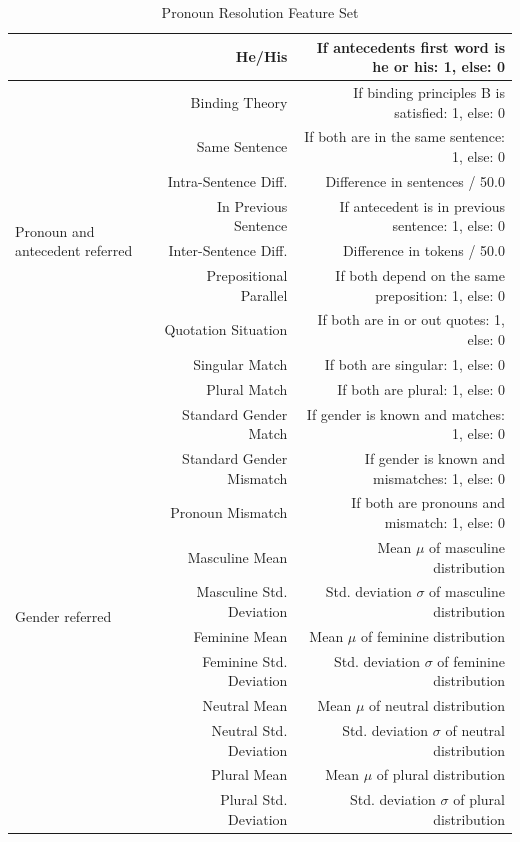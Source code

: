 \begin{table}[p]
{\begin{tabular}{| l |r | r |}
	& He/His & If antecedents first word is he or his: 1, else: 0 \\  \hline
	\hline
	\multirow{9}{1.3cm}{Pronoun and antecedent referred} & Binding Theory & If binding principles B is satisfied: 1, else: 0 \\ \cline{2-3}
 	& Same Sentence &  If both are in the same sentence: 1, else: 0 \\	\cline{2-3}
	& Intra-Sentence Diff. &  Difference in sentences / 50.0 \\	\cline{2-3}
	& In Previous Sentence & If antecedent is in previous sentence: 1, else: 0 \\ \cline{2-3}
	& Inter-Sentence Diff. & Difference in tokens / 50.0\\ \cline{2-3}
	& Prepositional Parallel & If both depend on the same preposition: 1, else: 0 \\ \cline{2-3}
	& Quotation Situation & If both are in or out quotes: 1, else: 0 \\ \cline{2-3}
	& Singular Match & If both are singular: 1, else: 0 \\ \cline{2-3}
	& Plural Match & If both are plural: 1, else: 0 \\ \hline
	\hline
	\multirow{11}{1.3cm}{Gender referred} & Standard Gender Match & If gender is known and matches: 1, else: 0 \\ \cline{2-3}
 	& Standard Gender Mismatch &  If gender is known and mismatches: 1, else: 0 \\	\cline{2-3}
	& Pronoun Mismatch &  If both are pronouns and mismatch: 1, else: 0 \\	\cline{2-3}
	& Masculine Mean & Mean $\mu$ of masculine distribution \\ \cline{2-3}
	& Masculine Std. Deviation & Std. deviation $\sigma$ of masculine distribution \\ \cline{2-3}
	& Feminine Mean &  Mean $\mu$ of feminine distribution \\ \cline{2-3}
	& Feminine Std. Deviation & Std. deviation $\sigma$  of feminine distribution \\ \cline{2-3}
	& Neutral Mean &  Mean $\mu$ of neutral distribution \\ \cline{2-3}
	& Neutral Std. Deviation & Std. deviation $\sigma$  of neutral distribution \\ \cline{2-3}
	& Plural Mean &  Mean $\mu$ of plural distribution \\ \cline{2-3}
	& Plural Std. Deviation & Std. deviation $\sigma$  of plural distribution \\ \hline

  \end{tabular}
}
  \caption{Pronoun Resolution Feature Set}
	\label{table:wholefeatureset}
\end{table}

